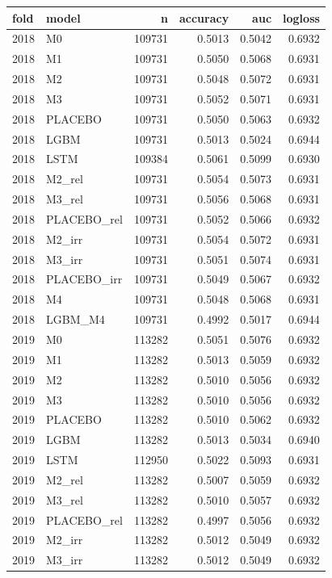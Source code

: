 \begin{tabular}{llrrrr}
\toprule
fold & model & n & accuracy & auc & logloss \\
\midrule
2018 & M0 & 109731 & 0.5013 & 0.5042 & 0.6932 \\
2018 & M1 & 109731 & 0.5050 & 0.5068 & 0.6931 \\
2018 & M2 & 109731 & 0.5048 & 0.5072 & 0.6931 \\
2018 & M3 & 109731 & 0.5052 & 0.5071 & 0.6931 \\
2018 & PLACEBO & 109731 & 0.5050 & 0.5063 & 0.6932 \\
2018 & LGBM & 109731 & 0.5013 & 0.5024 & 0.6944 \\
2018 & LSTM & 109384 & 0.5061 & 0.5099 & 0.6930 \\
2018 & M2\_rel & 109731 & 0.5054 & 0.5073 & 0.6931 \\
2018 & M3\_rel & 109731 & 0.5056 & 0.5068 & 0.6931 \\
2018 & PLACEBO\_rel & 109731 & 0.5052 & 0.5066 & 0.6932 \\
2018 & M2\_irr & 109731 & 0.5054 & 0.5072 & 0.6931 \\
2018 & M3\_irr & 109731 & 0.5051 & 0.5074 & 0.6931 \\
2018 & PLACEBO\_irr & 109731 & 0.5049 & 0.5067 & 0.6932 \\
2018 & M4 & 109731 & 0.5048 & 0.5068 & 0.6931 \\
2018 & LGBM\_M4 & 109731 & 0.4992 & 0.5017 & 0.6944 \\
2019 & M0 & 113282 & 0.5051 & 0.5076 & 0.6932 \\
2019 & M1 & 113282 & 0.5013 & 0.5059 & 0.6932 \\
2019 & M2 & 113282 & 0.5010 & 0.5056 & 0.6932 \\
2019 & M3 & 113282 & 0.5010 & 0.5056 & 0.6932 \\
2019 & PLACEBO & 113282 & 0.5010 & 0.5062 & 0.6932 \\
2019 & LGBM & 113282 & 0.5013 & 0.5034 & 0.6940 \\
2019 & LSTM & 112950 & 0.5022 & 0.5093 & 0.6931 \\
2019 & M2\_rel & 113282 & 0.5007 & 0.5059 & 0.6932 \\
2019 & M3\_rel & 113282 & 0.5010 & 0.5057 & 0.6932 \\
2019 & PLACEBO\_rel & 113282 & 0.4997 & 0.5056 & 0.6932 \\
2019 & M2\_irr & 113282 & 0.5012 & 0.5049 & 0.6932 \\
2019 & M3\_irr & 113282 & 0.5012 & 0.5049 & 0.6932 \\

\end{tabular}

